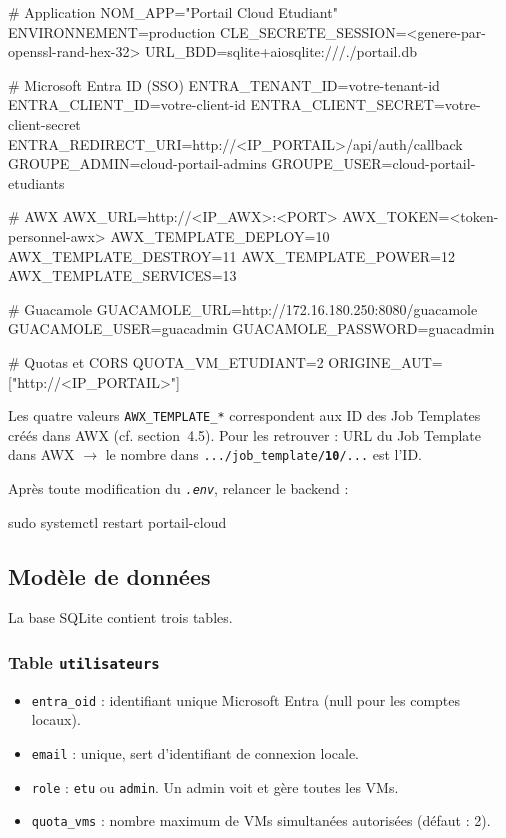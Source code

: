 \documentclass[a4paper]{article}
\newcommand{\cmd}[1]{\texttt{#1}}
\newcommand{\file}[1]{\texttt{\textit{#1}}}
\begin{document}
\begin{bashcode}
# Application
NOM_APP="Portail Cloud Etudiant"
ENVIRONNEMENT=production
CLE_SECRETE_SESSION=<genere-par-openssl-rand-hex-32>
URL_BDD=sqlite+aiosqlite:///./portail.db

# Microsoft Entra ID (SSO)
ENTRA_TENANT_ID=votre-tenant-id
ENTRA_CLIENT_ID=votre-client-id
ENTRA_CLIENT_SECRET=votre-client-secret
ENTRA_REDIRECT_URI=http://<IP_PORTAIL>/api/auth/callback
GROUPE_ADMIN=cloud-portail-admins
GROUPE_USER=cloud-portail-etudiants

# AWX
AWX_URL=http://<IP_AWX>:<PORT>
AWX_TOKEN=<token-personnel-awx>
AWX_TEMPLATE_DEPLOY=10
AWX_TEMPLATE_DESTROY=11
AWX_TEMPLATE_POWER=12
AWX_TEMPLATE_SERVICES=13

# Guacamole
GUACAMOLE_URL=http://172.16.180.250:8080/guacamole
GUACAMOLE_USER=guacadmin
GUACAMOLE_PASSWORD=guacadmin

# Quotas et CORS
QUOTA_VM_ETUDIANT=2
ORIGINE_AUT=["http://<IP_PORTAIL>"]
\end{bashcode}

Les quatre valeurs \cmd{AWX\_TEMPLATE\_*} correspondent aux ID des Job Templates créés dans AWX (cf. section~4.5). Pour les retrouver : URL du Job Template dans AWX \(\to\) le nombre dans \cmd{.../job\_template/\textbf{10}/...} est l'ID.

Après toute modification du \file{.env}, relancer le backend :

\begin{bashcode}
sudo systemctl restart portail-cloud
\end{bashcode}

\subsection{Modèle de données}

La base SQLite contient trois tables.

\subsubsection*{Table \texttt{utilisateurs}}

\begin{itemize}
  \item \cmd{entra\_oid} : identifiant unique Microsoft Entra (null pour les comptes locaux).
  \item \cmd{email} : unique, sert d'identifiant de connexion locale.
  \item \cmd{role} : \cmd{etu} ou \cmd{admin}. Un admin voit et gère toutes les VMs.
  \item \cmd{quota\_vms} : nombre maximum de VMs simultanées autorisées (défaut : 2).
\end{itemize}
\end{document}
